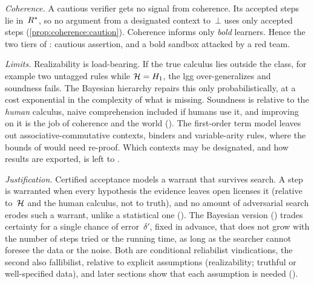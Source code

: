 \emph{Coherence.} A cautious verifier gets no signal from coherence. Its accepted steps lie in~$R^{*}$, so no argument from a designated context to~$\bot$ uses only accepted steps (\cref{prop:coherence:caution}). Coherence informs only \emph{bold} learners. Hence the two tiers of : cautious assertion, and a bold sandbox attacked by a red team.

\emph{Limits.} Realizability is load-bearing. If the true calculus lies outside the class, for example two untagged rules while $\mathcal{H}=H_1$, the lgg over-generalizes and soundness fails. The Bayesian hierarchy repairs this only probabilistically, at a cost exponential in the complexity of what is missing. Soundness is relative to the \emph{human} calculus, naive comprehension included if humans use it, and improving on it is the job of coherence and the world (). The first-order term model leaves out associative-commutative contexts, binders and variable-arity rules, where the bounds of  would need re-proof. Which contexts may be designated, and how results are exported, is left to .

\emph{Justification.} Certified acceptance models a warrant that survives search. A step is warranted when every hypothesis the evidence leaves open licenses it (relative to~$\mathcal{H}$ and the human calculus, not to truth), and no amount of adversarial search erodes such a warrant, unlike a statistical one (). The Bayesian version () trades certainty for a single chance of error~$\delta'$, fixed in advance, that does not grow with the number of steps tried or the running time, as long as the searcher cannot foresee the data or the noise. Both are conditional reliabilist vindications, the second also fallibilist, relative to explicit assumptions (realizability; truthful or well-specified data), and later sections show that each assumption is needed ().
